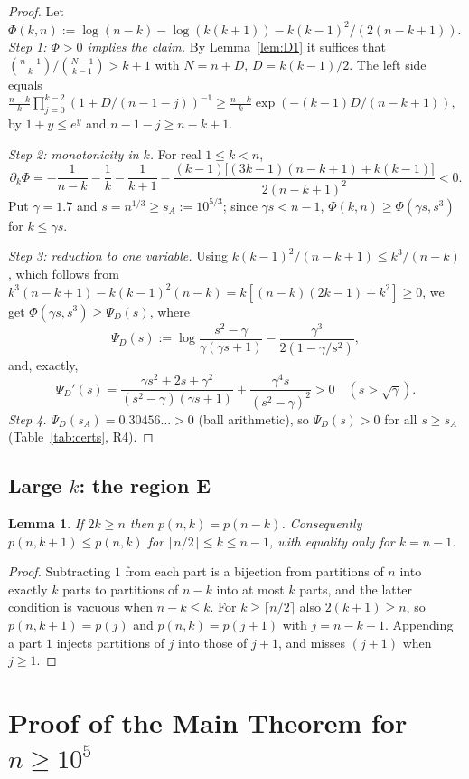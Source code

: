 \documentclass[11pt]{amsart}
\newtheorem{lemma}[theorem]{Lemma}
\theoremstyle{definition}
\theoremstyle{remark}
\numberwithin{equation}{section}
\begin{document}
\begin{proof}
Let $\Phi(k,n):=\log(n-k)-\log(k(k+1))-k(k-1)^2/(2(n-k+1))$. \emph{Step 1: $\Phi>0$ implies the claim.} By Lemma~\ref{lem:D1} it suffices
that $\binom{n-1}{k}/\binom{N-1}{k-1}>k+1$ with $N=n+D$, $D=k(k-1)/2$. The left side equals
$\frac{n-k}k\prod_{j=0}^{k-2}(1+D/(n-1-j))^{-1}\ge\frac{n-k}k\exp(-(k-1)D/(n-k+1))$, by $1+y\le e^y$ and $n-1-j\ge n-k+1$.

\emph{Step 2: monotonicity in $k$.} For real $1\le k<n$,
\[
  \partial_k\Phi=-\frac1{n-k}-\frac1k-\frac1{k+1}-\frac{(k-1)\bigl[(3k-1)(n-k+1)+k(k-1)\bigr]}{2(n-k+1)^2}<0 .
\]
Put $\gamma=1.7$ and $s=n^{1/3}\ge s_A:=10^{5/3}$; since $\gamma s<n-1$, $\Phi(k,n)\ge\Phi(\gamma s,s^3)$ for $k\le\gamma s$.

\emph{Step 3: reduction to one variable.} Using $k(k-1)^2/(n-k+1)\le k^3/(n-k)$, which follows from
$k^3(n-k+1)-k(k-1)^2(n-k)=k[(n-k)(2k-1)+k^2]\ge0$, we get $\Phi(\gamma s,s^3)\ge\Psi_D(s)$, where
\[
  \Psi_D(s):=\log\frac{s^2-\gamma}{\gamma(\gamma s+1)}-\frac{\gamma^3}{2(1-\gamma/s^2)},
\]
and, exactly,
\[
  \Psi_D'(s)=\frac{\gamma s^2+2s+\gamma^2}{(s^2-\gamma)(\gamma s+1)}+\frac{\gamma^4s}{(s^2-\gamma)^2}>0\quad(s>\sqrt\gamma).
\]
\emph{Step 4.} $\Psi_D(s_A)=0.30456\ldots>0$ (ball arithmetic), so $\Psi_D(s)>0$ for all $s\ge s_A$ (Table~\ref{tab:certs}, R4).
\end{proof}

\subsection{Large \texorpdfstring{$k$}{k}: the region E}
\begin{lemma}\label{lem:E}
If $2k\ge n$ then $p(n,k)=p(n-k)$. Consequently $p(n,k+1)\le p(n,k)$ for $\lceil n/2\rceil\le k\le n-1$, with equality only for $k=n-1$.
\end{lemma}

\begin{proof}
Subtracting $1$ from each part is a bijection from partitions of $n$ into exactly $k$ parts to partitions of $n-k$ into at most $k$ parts,
and the latter condition is vacuous when $n-k\le k$. For $k\ge\lceil n/2\rceil$ also $2(k+1)\ge n$, so $p(n,k+1)=p(j)$ and $p(n,k)=p(j+1)$
with $j=n-k-1$. Appending a part $1$ injects partitions of $j$ into those of $j+1$, and misses $(j+1)$ when $j\ge1$.
\end{proof}

\section{Proof of the Main Theorem for \texorpdfstring{$n\ge10^5$}{n >= 10\^5}}\label{sec:assembly}
\end{document}
